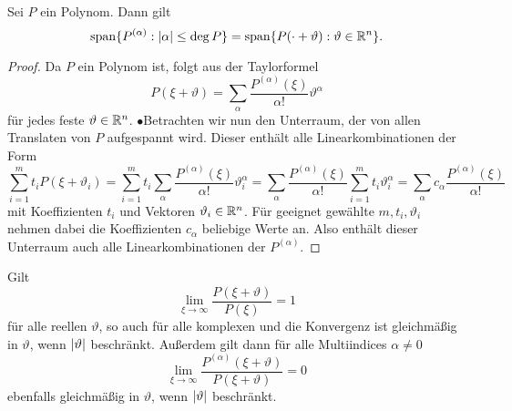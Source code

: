 \begin{lem}
Sei $P$ ein Polynom. Dann gilt 
\begin{equation}
\operatorname{span}\{P^{(\alpha)}:\lvert\alpha\rvert\leq \deg P\}=\operatorname{span}\{P(\cdot+\vartheta):\vartheta\in\mathbb R^n\}.
\end{equation}
\end{lem}
\begin{proof}
\relax[$\supseteq$] Da $P$ ein Polynom ist, folgt aus der Taylorformel
\begin{equation}
P(\xi+\vartheta)=\sum_\alpha \dfrac{P^{(\alpha)}(\xi)}{\alpha!}\vartheta^{\alpha}
\end{equation}
für jedes feste $\vartheta\in\mathbb R^n$. $\bullet$\qquad [$\subseteq$] Betrachten wir nun den Unterraum, der von allen Translaten von $P$ aufgespannt wird. Dieser enthält alle Linearkombinationen der Form
\begin{equation}
\sum_{i=1}^m t_i P(\xi+\vartheta_i)=\sum_{i=1}^mt_i\sum_\alpha \dfrac{P^{(\alpha)}(\xi)}{\alpha!}\vartheta_i^\alpha =\sum_\alpha \dfrac{P^{(\alpha)}(\xi)}{\alpha!} \sum_{i=1}^mt_i\vartheta_i^\alpha=\sum_\alpha c_\alpha \dfrac{P^{(\alpha)}(\xi)}{\alpha!}
\end{equation}
mit Koeffizienten $t_i$ und Vektoren $\vartheta_i\in\mathbb R^n$. Für geeignet gewählte $ m,t_i,\vartheta_i $ nehmen dabei die Koeffizienten $c_\alpha$ beliebige Werte an. Also enthält dieser Unterraum auch alle Linearkombinationen der $P^{(\alpha)}$.
\end{proof}
\begin{lem}
Gilt
\begin{equation}
\lim_{\xi\to\infty}\dfrac{P(\xi+\vartheta)}{P(\xi)}=1
\end{equation}
für alle reellen $\vartheta$, so auch für alle komplexen und die Konvergenz ist gleichmäßig in $\vartheta$, wenn $\lvert\vartheta\rvert$ beschränkt. Außerdem gilt dann für alle Multiindices $\alpha\neq0$
\begin{equation}
\lim_{\xi\to\infty}\dfrac{P^{(\alpha)}(\xi+\vartheta)}{P(\xi+\vartheta)}=0
\end{equation}
ebenfalls gleichmäßig in $\vartheta$, wenn $\lvert\vartheta\rvert$ beschränkt.
\end{lem}

